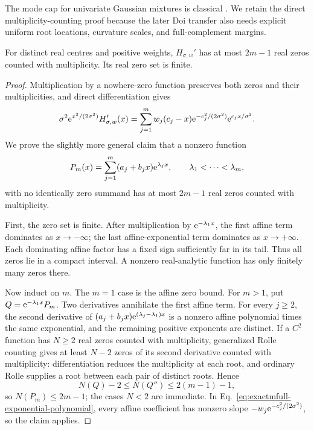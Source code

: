 The mode cap for univariate Gaussian mixtures is classical
\cite{carreiraPerpinanWilliams2003modes,amendolaEngstromHaase2020modes}.
We retain the direct multiplicity-counting proof because the later Doi
transfer also needs explicit uniform root locations, curvature scales, and
full-complement margins.

\begin{lemma}
\label{lem:exactmfull-zero-bound}
For distinct real centres and positive weights,
\(H_{\sigma,w}'\) has at most \(2m-1\) real zeros counted with
multiplicity.  Its real zero set is finite.
\end{lemma}

\begin{proof}
Multiplication by a nowhere-zero function preserves both zeros and their
multiplicities, and direct differentiation gives
\begin{equation}
 \sigma^2\mathrm e^{x^2/(2\sigma^2)}H_{\sigma,w}'(x)
 =\sum_{j=1}^m w_j(c_j-x)
   \mathrm e^{-c_j^2/(2\sigma^2)}\mathrm e^{c_jx/\sigma^2}.
 \label{eq:exactmfull-exponential-polynomial}
\end{equation}
We prove the slightly more general claim that a nonzero function
\begin{equation}
 P_m(x)=\sum_{j=1}^m(a_j+b_jx)\mathrm e^{\lambda_jx},
 \qquad \lambda_1<\cdots<\lambda_m,
 \label{eq:exactmfull-general-exp-polynomial}
\end{equation}
with no identically zero summand has at most \(2m-1\) real zeros counted
with multiplicity.

First, the zero set is finite.  After multiplication by
\(\mathrm e^{-\lambda_1x}\), the first affine term dominates as \(x\to-\infty\);
the last affine-exponential term dominates as \(x\to+\infty\).  Each
dominating affine factor has a fixed sign sufficiently far in its tail.
Thus all zeros lie in a compact interval.  A nonzero real-analytic function
has only finitely many zeros there.

Now induct on \(m\).  The \(m=1\) case is the affine zero bound.  For
\(m>1\), put \(Q=\mathrm e^{-\lambda_1x}P_m\).  Two derivatives annihilate the first
affine term.  For every \(j\ge2\), the second derivative of
\((a_j+b_jx)\mathrm e^{(\lambda_j-\lambda_1)x}\) is a nonzero affine polynomial
times the same exponential, and the remaining positive exponents are
distinct.  If a \(C^2\) function has \(N\ge2\) real zeros counted with
multiplicity, generalized Rolle counting gives at least \(N-2\) zeros of
its second derivative counted with multiplicity: differentiation reduces
the multiplicity at each root, and ordinary Rolle supplies a root between
each pair of distinct roots.  Hence
\begin{equation}
 N(Q)-2\le N(Q'')\le2(m-1)-1,
 \label{eq:exactmfull-rolle-count}
\end{equation}
so \(N(P_m)\le2m-1\); the cases \(N<2\) are immediate.  In
Eq.~\eqref{eq:exactmfull-exponential-polynomial}, every affine coefficient
has nonzero slope
\(-w_j\mathrm e^{-c_j^2/(2\sigma^2)}\), so the claim applies.
\end{proof}

